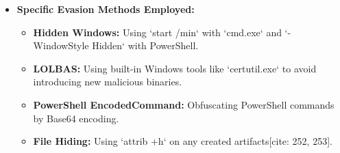 \documentclass[11pt]{article}
\begin{document}
\begin{itemize}
\begin{enumerate}
		\end{enumerate}
		\item \textbf{Specific Evasion Methods Employed:}
		\begin{itemize}
			\item \textbf{Hidden Windows:} Using `start /min` with `cmd.exe` and `-WindowStyle Hidden` with PowerShell.
			\item \textbf{LOLBAS:} Using built-in Windows tools like `certutil.exe` to avoid introducing new malicious binaries.
			\item \textbf{PowerShell EncodedCommand:} Obfuscating PowerShell commands by Base64 encoding.
			\item \textbf{File Hiding:} Using `attrib +h` on any created artifacts[cite: 252, 253].
		\end{itemize}
	\end{itemize}
	
\end{document}
